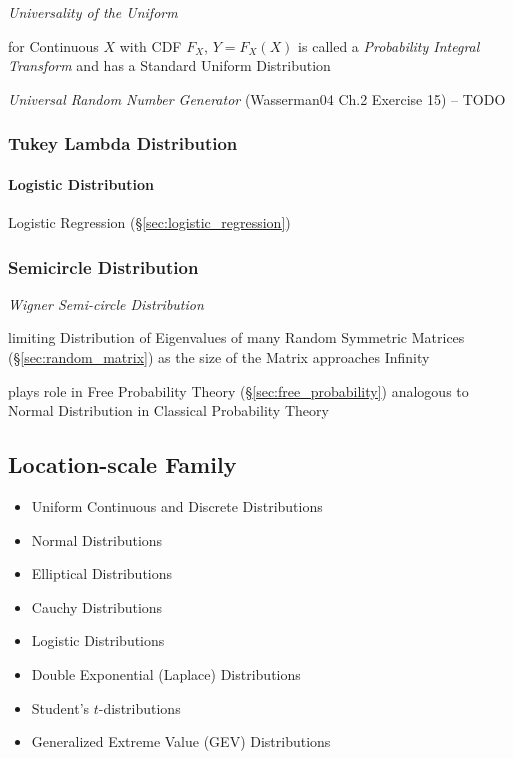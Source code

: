\emph{Universality of the Uniform}

for Continuous $X$ with CDF $F_X$, $Y = F_X(X)$ is called a \emph{Probability
  Integral Transform} and has a Standard Uniform Distribution

\emph{Universal Random Number Generator} (Wasserman04 Ch.2 Exercise 15) -- TODO



\subsubsection{Tukey Lambda Distribution}\label{sec:tukey_lambda_distribution}

\paragraph{Logistic Distribution}\label{sec:logistic_distribution}\hfill

\fist Logistic Regression (\S\ref{sec:logistic_regression})



\subsubsection{Semicircle Distribution}\label{sec:semicircle_distribution}

\emph{Wigner Semi-circle Distribution}

limiting Distribution of Eigenvalues of many Random Symmetric Matrices
(\S\ref{sec:random_matrix}) as the size of the Matrix approaches Infinity

plays role in Free Probability Theory (\S\ref{sec:free_probability}) analogous
to Normal Distribution in Classical Probability Theory



\subsection{Location-scale Family}\label{sec:location_scale}

\begin{itemize}
  \item Uniform Continuous and Discrete Distributions
  \item Normal Distributions
  \item Elliptical Distributions
  \item Cauchy Distributions
  \item Logistic Distributions
  \item Double Exponential (Laplace) Distributions
  \item Student's $t$-distributions
  \item Generalized Extreme Value (GEV) Distributions
\end{itemize}


